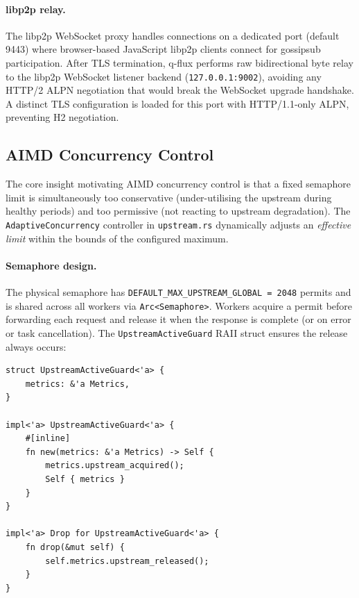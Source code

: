 \documentclass[a4paper, 11pt]{article}
\begin{document}
\paragraph{libp2p relay.}  The libp2p WebSocket proxy handles connections on a
dedicated port (default 9443) where browser-based JavaScript libp2p clients
connect for gossipsub participation.  After TLS termination, q-flux performs raw
bidirectional byte relay to the libp2p WebSocket listener backend
(\texttt{127.0.0.1:9002}), avoiding any HTTP/2 ALPN negotiation that would
break the WebSocket upgrade handshake.  A distinct TLS configuration is loaded
for this port with HTTP/1.1-only ALPN, preventing H2 negotiation.

\subsection{AIMD Concurrency Control}
\label{sec:aimd}

The core insight motivating AIMD concurrency control is that a fixed semaphore
limit is simultaneously too conservative (under-utilising the upstream during
healthy periods) and too permissive (not reacting to upstream degradation).  The
\texttt{AdaptiveConcurrency} controller in \texttt{upstream.rs} dynamically
adjusts an \emph{effective limit} within the bounds of the configured maximum.

\paragraph{Semaphore design.}  The physical semaphore has
\texttt{DEFAULT\_MAX\_UPSTREAM\_GLOBAL~=~2048} permits and is shared across all
workers via \texttt{Arc<Semaphore>}.  Workers acquire a permit before forwarding
each request and release it when the response is complete (or on error or task
cancellation).  The \texttt{UpstreamActiveGuard} RAII struct ensures the release
always occurs:

\begin{lstlisting}[caption={UpstreamActiveGuard RAII pattern (upstream.rs).},
                   label={lst:guard}]
struct UpstreamActiveGuard<'a> {
    metrics: &'a Metrics,
}

impl<'a> UpstreamActiveGuard<'a> {
    #[inline]
    fn new(metrics: &'a Metrics) -> Self {
        metrics.upstream_acquired();
        Self { metrics }
    }
}

impl<'a> Drop for UpstreamActiveGuard<'a> {
    fn drop(&mut self) {
        self.metrics.upstream_released();
    }
}
\end{lstlisting}
\end{document}
